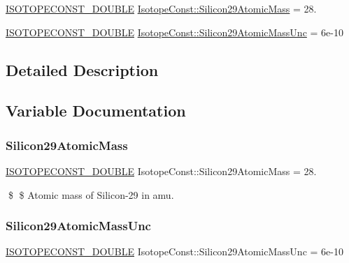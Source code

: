 \begin{DoxyCompactItemize}
\item 
\mbox{\hyperlink{group___isotope_const-_macros_ga8f45a7272ce02c0b4c65c44636ed719a}{I\+S\+O\+T\+O\+P\+E\+C\+O\+N\+S\+T\+\_\+\+D\+O\+U\+B\+LE}} \mbox{\hyperlink{group___isotope_const-_silicon-_si29_ga1a066a2ce1c82a02f65b77f5e83fb8b8}{Isotope\+Const\+::\+Silicon29\+Atomic\+Mass}} = 28.
\item 
\mbox{\hyperlink{group___isotope_const-_macros_ga8f45a7272ce02c0b4c65c44636ed719a}{I\+S\+O\+T\+O\+P\+E\+C\+O\+N\+S\+T\+\_\+\+D\+O\+U\+B\+LE}} \mbox{\hyperlink{group___isotope_const-_silicon-_si29_gac939df42a3423c8e6439487a6b174fcd}{Isotope\+Const\+::\+Silicon29\+Atomic\+Mass\+Unc}} = 6e-\/10
\end{DoxyCompactItemize}


\subsection{Detailed Description}


\subsection{Variable Documentation}
\mbox{\label{group___isotope_const-_silicon-_si29_ga1a066a2ce1c82a02f65b77f5e83fb8b8}} 
\subsubsection{\texorpdfstring{Silicon29\+Atomic\+Mass}{Silicon29AtomicMass}}
{\footnotesize\ttfamily \mbox{\hyperlink{group___isotope_const-_macros_ga8f45a7272ce02c0b4c65c44636ed719a}{I\+S\+O\+T\+O\+P\+E\+C\+O\+N\+S\+T\+\_\+\+D\+O\+U\+B\+LE}} Isotope\+Const\+::\+Silicon29\+Atomic\+Mass = 28.}

\$ \$ Atomic mass of Silicon-\/29 in amu. \mbox{\label{group___isotope_const-_silicon-_si29_gac939df42a3423c8e6439487a6b174fcd}} 
\subsubsection{\texorpdfstring{Silicon29\+Atomic\+Mass\+Unc}{Silicon29AtomicMassUnc}}
{\footnotesize\ttfamily \mbox{\hyperlink{group___isotope_const-_macros_ga8f45a7272ce02c0b4c65c44636ed719a}{I\+S\+O\+T\+O\+P\+E\+C\+O\+N\+S\+T\+\_\+\+D\+O\+U\+B\+LE}} Isotope\+Const\+::\+Silicon29\+Atomic\+Mass\+Unc = 6e-\/10}

